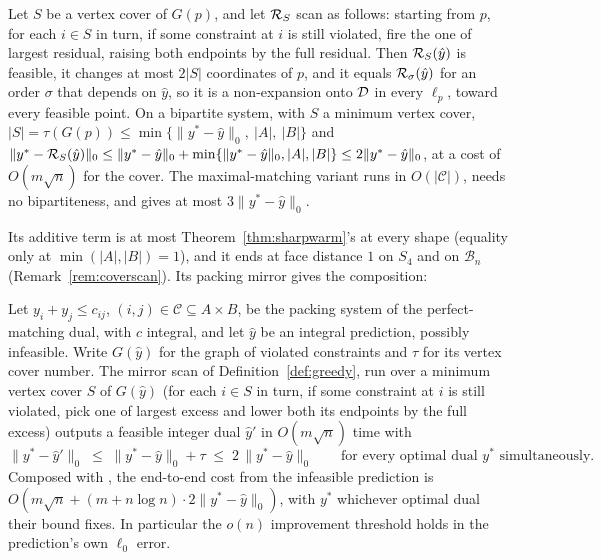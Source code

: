 \begin{theorem}\label{thm:coverscan}
Let $S$ be a vertex cover of $G(p)$, and let $\mathcal{R}_S$ scan as follows: starting from $p$, for
each $i \in S$ in turn, if some constraint at $i$ is still violated, fire the one of largest
residual, raising both endpoints by the full residual. Then $\mathcal{R}_S(\hat y)$ is feasible, it
changes at most $2|S|$ coordinates of $p$, and it equals $\mathcal{R}_\sigma(\hat y)$ for an order
$\sigma$ that depends on $\hat y$, so it is a non-expansion onto $\mathcal{D}$ in every $\ell_p$, toward
every feasible point. On a bipartite system, with $S$ a minimum vertex cover,
$|S| = \tau(G(p)) \le \min\{\|y^* - \hat y\|_0,\ |A|,\ |B|\}$ and
$\|y^* - \mathcal{R}_S(\hat y)\|_0 \le \|y^* - \hat y\|_0 + \min\{\|y^* - \hat y\|_0, |A|, |B|\}
\le 2\|y^* - \hat y\|_0$, at a cost of $O(m\sqrt n)$ for the cover. The maximal-matching variant runs in
$O(|\mathcal C|)$, needs no bipartiteness, and gives at most $3\|y^* - \hat y\|_0$.
\end{theorem}

Its additive term is at most Theorem~\ref{thm:sharpwarm}'s at every shape (equality only at
$\min(|A|,|B|) = 1$), and it ends at face distance $1$ on $S_4$ and on $\mathcal{B}_n$
(Remark~\ref{rem:coverscan}). Its packing mirror gives the composition:

\begin{theorem}\label{thm:composed}
Let $y_i + y_j \le c_{ij}$, $(i,j) \in \mathcal{C} \subseteq A \times B$, be the packing system of
the perfect-matching dual, with $c$ integral, and let $\hat y$ be an integral prediction, possibly
infeasible. Write $G(\hat y)$ for the graph of violated constraints and $\tau$ for its vertex
cover number. The mirror scan of Definition~\ref{def:greedy}, run over a minimum vertex cover $S$
of $G(\hat y)$ (for each $i \in S$ in turn, if some constraint at $i$ is still violated, pick
one of largest excess and lower both its endpoints by the full excess) outputs a feasible
integer dual $\hat y'$ in $O(m\sqrt{n})$ time with
\[
\|y^* - \hat y'\|_0 \;\le\; \|y^* - \hat y\|_0 + \tau \;\le\; 2\,\|y^* - \hat y\|_0
\qquad\text{for every optimal dual $y^*$ simultaneously.}
\]
Composed with \citet[Thm.~3.2]{chen2022}, the end-to-end cost from the infeasible prediction is
$O(m\sqrt{n} + (m + n\log n)\cdot 2\|y^* - \hat{y}\|_0)$, with $y^*$ whichever optimal dual their bound fixes. In particular the $o(n)$ improvement
threshold holds in the prediction's own $\ell_0$ error.
\end{theorem}

